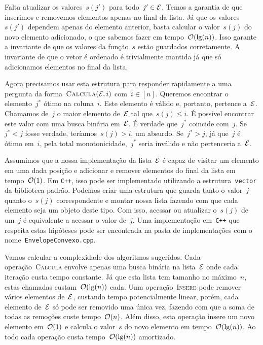 Falta atualizar os valores~$s(j')$ para todo~$j' \in \mathcal{E}$. Temos a garantia de que inserimos e removemos elementos apenas no final da lista. Já que os valores~$s(j')$ dependem apenas do elemento anterior, basta calcular o valor~$s(j)$ do novo elemento adicionado, o que sabemos fazer em tempo~$\mathcal{O}(\lg(n))$. Isso garante a invariante de que os valores da função~$s$ estão guardados corretamente. A invariante de que o vetor é ordenado é trivialmente mantida já que só adicionamos elementos no final da lista.

Agora precisamos usar esta estrutura para responder rapidamente a uma pergunta da forma~${ \textsc{Calcula}(\mathcal{E},i) }$ com~$i \in [n]$. Queremos encontrar o elemento~$j^*$ ótimo na coluna~$i$. Este elemento é válido e, portanto, pertence a~$\mathcal{E}$. Chamamos de~$j$ o maior elemento de~$\mathcal{E}$ tal que~$s(j) \leq i$. É possível encontrar este valor com uma busca binária em~$\mathcal{E}$. É verdade que~$j^*$ coincide com~$j$. Se~${ j^* < j }$ fosse verdade, teríamos~${ s(j) > i }$, um absurdo. Se~${ j^* > j }$, já que~$j$ é ótimo em~$i$, pela total monotonicidade,~$j^*$ seria inválido e não pertenceria a~$\mathcal{E}$.

Assumimos que a nossa implementação da lista~$\mathcal{E}$ é capaz de visitar um elemento em uma dada posição e adicionar e remover elementos do final da lista em tempo~$\mathcal{O}(1)$. Em \texttt{C++}, isso pode ser implementado utilizando a estrutura~\texttt{vector} da biblioteca padrão. Podemos criar uma estrutura que guarda tanto o valor~$j$ quanto o~$s(j)$ correspondente e montar nossa lista fazendo com que cada elemento seja um objeto deste tipo. Com isso, acessar ou atualizar o~$s(j)$ de um~$j$ é equivalente a acessar o valor de~$j$. Uma implementação em~\texttt{C++} que respeita estas hipóteses pode ser encontrada na pasta de implementações com o nome~\texttt{EnvelopeConvexo.cpp}.

Vamos calcular a complexidade dos algoritmos sugeridos. Cada operação~\textsc{Calcula} envolve apenas uma busca binária na lista~$\mathcal{E}$ onde cada iteração custa tempo constante. Já que esta lista tem tamanho no máximo~$n$, estas chamadas custam~$\mathcal{O}(\lg(n))$ cada. Uma operação~\textsc{Insere} pode remover vários elementos de~$\mathcal{E}$, custando tempo potencialmente linear, porém, cada elemento de~$\mathcal{E}$ só pode ser removido uma única vez, fazendo com que a soma de todas as remoções custe tempo~$\mathcal{O}(n)$. Além disso, esta operação insere um novo elemento em~$\mathcal{O}(1)$ e calcula o valor~$s$ do novo elemento em tempo~$\mathcal{O}(\lg(n))$. Ao todo cada operação custa tempo~$\mathcal{O}(\lg(n))$ amortizado.

